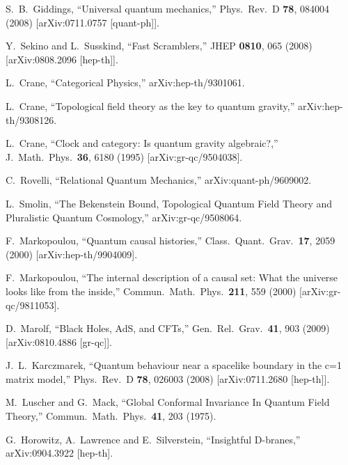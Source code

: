 \documentclass[12pt,epsf]{article}
\renewcommand{\(}{\left(}
\renewcommand{\)}{\right)}
\begin{document}
\begin{thebibliography}{999}
  S.~B.~Giddings,
  ``Universal quantum mechanics,''
  Phys.\ Rev.\  D {\bf 78}, 084004 (2008)
  [arXiv:0711.0757 [quant-ph]].


  Y.~Sekino and L.~Susskind,
  ``Fast Scramblers,''
  JHEP {\bf 0810}, 065 (2008)
  [arXiv:0808.2096 [hep-th]].


  L.~Crane,
  ``Categorical Physics,''
  arXiv:hep-th/9301061.

  L.~Crane,
  ``Topological field theory as the key to quantum gravity,''
  arXiv:hep-th/9308126.

  L.~Crane,
  ``Clock and category: Is quantum gravity algebraic?,''
  J.\ Math.\ Phys.\  {\bf 36}, 6180 (1995)
  [arXiv:gr-qc/9504038].

  C.~Rovelli,
  ``Relational Quantum Mechanics,''
  arXiv:quant-ph/9609002.

  L.~Smolin,
   ``The Bekenstein Bound, Topological Quantum Field Theory and Pluralistic
  Quantum Cosmology,''
  arXiv:gr-qc/9508064.

  F.~Markopoulou,
  ``Quantum causal histories,''
  Class.\ Quant.\ Grav.\  {\bf 17}, 2059 (2000)
  [arXiv:hep-th/9904009].

  F.~Markopoulou,
   ``The internal description of a causal set: What the universe looks like from
  the inside,''
  Commun.\ Math.\ Phys.\  {\bf 211}, 559 (2000)
  [arXiv:gr-qc/9811053].

  D.~Marolf,
  ``Black Holes, AdS, and CFTs,''
  Gen.\ Rel.\ Grav.\  {\bf 41}, 903 (2009)
  [arXiv:0810.4886 [gr-qc]].

 J.~L.~Karczmarek,
  ``Quantum behaviour near a spacelike boundary in the c=1 matrix model,''
  Phys.\ Rev.\  D {\bf 78}, 026003 (2008)
  [arXiv:0711.2680 [hep-th]].

  M.~Luscher and G.~Mack,
  ``Global Conformal Invariance In Quantum Field Theory,''
  Commun.\ Math.\ Phys.\  {\bf 41}, 203 (1975).

  G.~Horowitz, A.~Lawrence and E.~Silverstein,
  ``Insightful D-branes,''
  arXiv:0904.3922 [hep-th].


\end{thebibliography}
\end{document}
